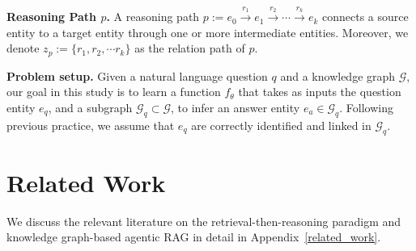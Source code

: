 \documentclass{article}
\theoremstyle{plain}
\theoremstyle{definition}
\theoremstyle{remark}
\newcommand{\tb}[1]{\textbf{#1}}
\newcommand{\mcal}[1]{\mathcal{#1}}
\begin{document}
\noindent\tb{Reasoning Path $p$.}
A reasoning path $p:=e_0 \xrightarrow{r_1} e_1 \xrightarrow{r_2} \cdots \xrightarrow{r_k} e_k$ connects a source entity to a target entity through one or more intermediate entities. Moreover, we denote $z_p:=\{r_1,r_2,\cdots r_k\}$ as the relation path of $p$.

\noindent\tb{Problem setup.} Given a natural language question $q$ and a knowledge graph $\mcal{G}$, our goal in this study is to learn a function $f_\theta$ that takes as inputs the question entity $e_q$, and a subgraph $\mcal{G}_q \subset \mcal{G}$, to infer an answer entity $e_a \in \mcal{G}_q$. Following previous practice, we assume that $e_q$ are correctly identified and linked in $\mcal{G}_q$.

\section{Related Work}
We discuss the relevant literature on the retrieval-then-reasoning paradigm and knowledge graph-based agentic RAG in detail in Appendix~\ref{related_work}.
\end{document}
